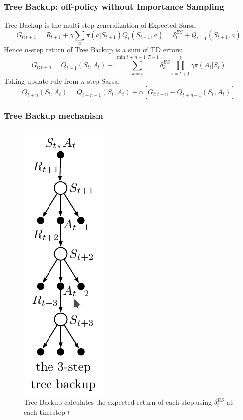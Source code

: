 \documentclass{beamer}
\begin{document}
\begin{frame}
  \frametitle{Tree Backup: off-policy without Importance Sampling}
  Tree Backup is the multi-step generalization of Expected Sarsa:
  $$G_{t : t + 1} \overset{\cdot}{=} R_{t + 1} +
    \gamma \sum_{a} \pi(a | S_{t + 1}) Q_t(S_{t + 1}, a) = \delta^{ES}_t
    + Q_{t - 1}(S_{t + 1}, a)$$
  Hence $n$-step return of Tree Backup is a sum of TD errors:
  $$G_{t : t + n} \overset{\cdot}{=} Q_{t -1}(S_t, A_t) +
    \sum_{k = t}^{\min{t + n - 1, T - 1}} \delta_k^{ES} \prod_{i = t + 1}^k
    \gamma \pi(A_i | S_i)$$
  Taking update rule from $n$-step Sarsa:
  $$Q_{t + n}(S_t, A_t) \overset{\cdot}{=} Q_{t + n - 1}(S_t, A_t) +
    \alpha[G_{t : t + n} - Q_{t + n -1}(S_t, A_t)]$$
\end{frame}

\begin{frame}
  \frametitle{Tree Backup mechanism}
  \begin{figure}
    \centering
    \includegraphics[height=0.7 \textheight]{tree_backup}
    \caption{Tree Backup calculates the expected return of each step using
      $\delta_t^{ES}$ at each timestep $t$}
  \end{figure}
\end{frame}
\end{document}
